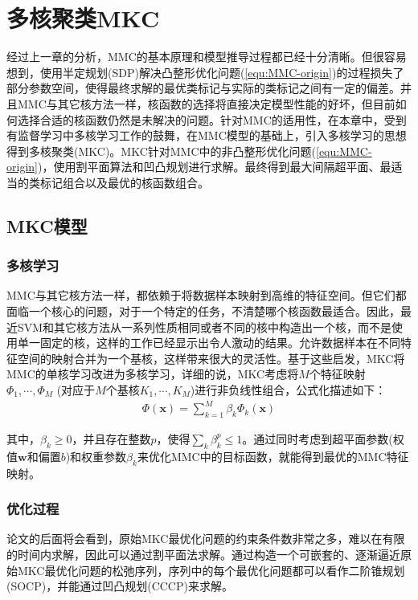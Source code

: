 \chapter{多核聚类MKC}
经过上一章的分析，MMC的基本原理和模型推导过程都已经十分清晰。但很容易想到，使用半定规划(SDP)解决凸整形优化问题(\ref{equ:MMC-origin})的过程损失了部分参数空间，使得最终求解的最优类标记与实际的类标记之间有一定的偏差。并且MMC与其它核方法一样，核函数的选择将直接决定模型性能的好坏，但目前如何选择合适的核函数仍然是未解决的问题。针对MMC的适用性，在本章中，受到有监督学习中多核学习工作的鼓舞，在MMC模型的基础上，引入多核学习的思想得到多核聚类(MKC)。MKC针对MMC中的非凸整形优化问题(\ref{equ:MMC-origin})，使用割平面算法和凹凸规划进行求解。最终得到最大间隔超平面、最适当的类标记组合以及最优的核函数组合。

\section{MKC模型}
\subsection{多核学习}
MMC与其它核方法一样，都依赖于将数据样本映射到高维的特征空间。但它们都面临一个核心的问题，对于一个特定的任务，不清楚哪个核函数最适合。因此，最近SVM和其它核方法从一系列性质相同或者不同的核中构造出一个核，而不是使用单一固定的核，这样的工作已经显示出令人激动的结果。允许数据样本在不同特征空间的映射合并为一个基核，这样带来很大的灵活性。基于这些启发，MKC将MMC的单核学习改进为多核学习，详细的说，MKC考虑将$M$个特征映射$\Phi_1,\cdots,\Phi_M$ (对应于$M$个基核$K_1,\cdots,K_M$)进行非负线性组合，公式化描述如下：
\begin{align} %
   \Phi(\mathbf{x})=\sum^M_{k=1}\beta_k\Phi_k(\mathbf{x})
\end{align}

其中，$\beta_k\ge 0$，并且存在整数$p$，使得$\sum_k\beta^p_k \le 1$。通过同时考虑到超平面参数(权值$\mathbf{w}$和偏置$b$)和权重参数$\beta_k$来优化MMC中的目标函数，就能得到最优的MMC特征映射。

\subsection{优化过程}
论文的后面将会看到，原始MKC最优化问题的约束条件数非常之多，难以在有限的时间内求解，因此可以通过割平面法求解。通过构造一个可嵌套的、逐渐逼近原始MKC最优化问题的松弛序列，序列中的每个最优化问题都可以看作二阶锥规划(SOCP)，并能通过凹凸规划(CCCP)来求解。

